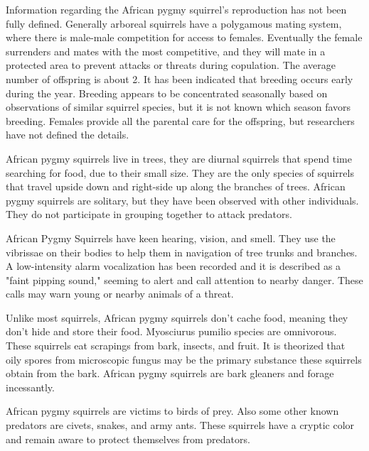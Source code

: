\documentclass[twoside, 12pt, letterpaper]{report}\usepackage[]{graphicx}\usepackage[]{color}
\begin{document}
\begin{multicols*}{2}
Information regarding the African pygmy squirrel's reproduction has not been fully defined. Generally arboreal squirrels have a polygamous mating system, where there is male-male competition for access to females. Eventually the female surrenders and mates with the most competitive, and they will mate in a protected area to prevent attacks or threats during copulation. The average number of offspring is about 2. It has been indicated that breeding occurs early during the year. Breeding appears to be concentrated seasonally based on observations of similar squirrel species, but it is not known which season favors breeding. Females provide all the parental care for the offspring, but researchers have not defined the details.

African pygmy squirrels live in trees, they are diurnal squirrels that spend time searching for food, due to their small size. They are the only species of squirrels that travel upside down and right-side up along the branches of trees. African pygmy squirrels are solitary, but they have been observed with other individuals. They do not participate in grouping together to attack predators.

African Pygmy Squirrels have keen hearing, vision, and smell. They use the vibrissae on their bodies to help them in navigation of tree trunks and branches. A low-intensity alarm vocalization has been recorded and it is described as a "faint pipping sound," seeming to alert and call attention to nearby danger. These calls may warn young or nearby animals of a threat.

Unlike most squirrels, African pygmy squirrels don't cache food, meaning they don't hide and store their food. Myosciurus pumilio species are omnivorous. These squirrels eat scrapings from bark, insects, and fruit. It is theorized that oily spores from microscopic fungus may be the primary substance these squirrels obtain from the bark. African pygmy squirrels are bark gleaners and forage incessantly.

African pygmy squirrels are victims to birds of prey. Also some other known predators are civets, snakes, and army ants. These squirrels have a cryptic color and remain aware to protect themselves from predators.



\end{multicols*}
\end{document}
